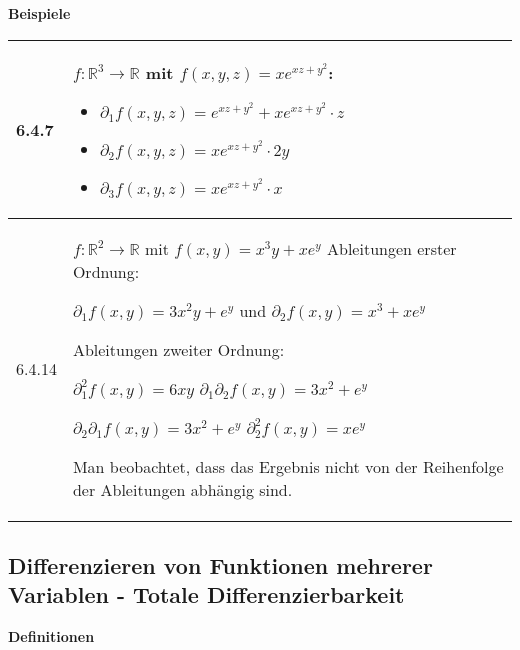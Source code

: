     \noindent
    \textbf{Beispiele}
    
    \begin{longtable}{p{1cm} p{16cm}}
        \toprule

        6.4.7 & $f: \mathbb{R}^3 \rightarrow \mathbb{R}$ mit $f(x,y,z) = xe^{xz+y^2}$: 
                \begin{itemize}[topsep=-0.5cm]
                    \item[] $\partial_1 f(x,y,z) = e^{xz+y^2} + xe^{xz+y^2} \cdot z$ 
                    \item[] $\partial_2 f(x,y,z) = xe^{xz+y^2} \cdot 2y$
                    \item[] $\partial_3 f(x,y,z) = xe^{xz+y^2} \cdot x$
                \end{itemize} \vspace{-0cm}\\
        \midrule
        6.4.14& $f: \mathbb{R}^2 \rightarrow \mathbb{R}$ mit $f(x,y) = x^3 y + x e^y$ \hfill \break
                Ableitungen erster Ordnung: \hfill \break
                \centerline{$ \partial_1f(x,y) = 3x^2y + e^y$ und $\partial_2f(x,y) = x^3 + xe^y$}
                Ableitungen zweiter Ordnung: \hfill \break
                \centerline{$\partial_1^2 f(x,y) =6xy$ \hspace{1cm} $\partial_1 \partial_2f(x,y) = 3x^2 + e^y $}
                \centerline{$ \partial_2 \partial_1 f(x,y) = 3x^2 + e^y$ \hspace{1cm} $\partial_2^2f(x,y) = xe^y$} 
                Man beobachtet, dass das Ergebnis nicht von der Reihenfolge der Ableitungen abhängig sind. \\

        \bottomrule
    \end{longtable}
    

    

\subsection{Differenzieren von Funktionen mehrerer Variablen - Totale Differenzierbarkeit}

    \noindent
    \textbf{Definitionen}
      
